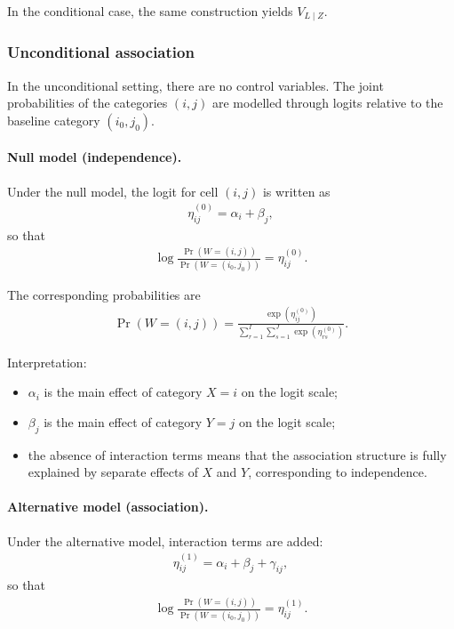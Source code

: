 \documentclass[11pt,a4paper]{article}
\begin{document}
In the conditional case, the same construction yields $V_{L\mid Z}$.

\subsubsection*{Unconditional association}

In the unconditional setting, there are no control variables. The joint probabilities of the categories $(i,j)$ are modelled through logits relative to the baseline category $(i_0,j_0)$.

\paragraph{Null model (independence).}

Under the null model, the logit for cell $(i,j)$ is written as
\begin{align}
\eta^{(0)}_{ij}
=
\alpha_i + \beta_j,
\end{align}
so that
\begin{align}
\log\frac{\Pr(W=(i,j))}{\Pr(W=(i_0,j_0))}
=
\eta^{(0)}_{ij}.
\end{align}

The corresponding probabilities are
\begin{align}
\Pr(W=(i,j))
=
\frac{\exp\!\left(\eta^{(0)}_{ij}\right)}
{\sum_{r=1}^I \sum_{s=1}^J \exp\!\left(\eta^{(0)}_{rs}\right)}.
\end{align}

Interpretation:
\begin{itemize}
\item $\alpha_i$ is the main effect of category $X=i$ on the logit scale;
\item $\beta_j$ is the main effect of category $Y=j$ on the logit scale;
\item the absence of interaction terms means that the association structure is fully explained by separate effects of $X$ and $Y$, corresponding to independence.
\end{itemize}

\paragraph{Alternative model (association).}

Under the alternative model, interaction terms are added:
\begin{align}
\eta^{(1)}_{ij}
=
\alpha_i + \beta_j + \gamma_{ij},
\end{align}
so that
\begin{align}
\log\frac{\Pr(W=(i,j))}{\Pr(W=(i_0,j_0))}
=
\eta^{(1)}_{ij}.
\end{align}
\end{document}
